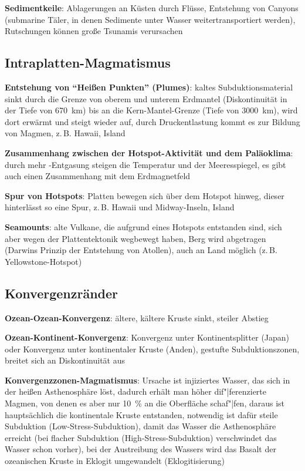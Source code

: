 \textbf{Sedimentkeile}:
Ablagerungen an Küsten durch Flüsse,
Entstehung von Canyons (submarine Täler, in denen Sedimente unter Wasser weitertransportiert
werden),
Rutschungen können große Tsunamis verursachen

\subsection{%
    Intraplatten-Magmatismus%
}

\textbf{Entstehung von "`Heißen Punkten"' (Plumes)}:
kaltes Subduktionsmaterial sinkt durch die Grenze von oberem und unterem Erdmantel
(Diskontinuität in der Tiefe von \SI{670}{\kilo\meter}) bis an die Kern-Mantel-Grenze
(Tiefe von \SI{3000}{\kilo\meter}), wird dort erwärmt und steigt wieder auf,
durch Druckentlastung kommt es zur Bildung von Magmen,
z.\,B. Hawaii, Island

\textbf{Zusammenhang zwischen der Hotspot-Aktivität und dem Paläoklima}:
durch mehr -Entgasung steigen die Temperatur und der Meeresspiegel,
es gibt auch einen Zusammenhang mit dem Erdmagnetfeld

\textbf{Spur von Hotspots}:
Platten bewegen sich über dem Hotspot hinweg,
dieser hinterlässt so eine Spur,
z.\,B. Hawaii und Midway-Inseln, Island

\textbf{Seamounts}:
alte Vulkane, die aufgrund eines Hotspots entstanden sind, sich aber wegen der Plattentektonik
wegbewegt haben,
Berg wird abgetragen (Darwins Prinzip der Entstehung von Atollen),
auch an Land möglich (z.\,B. Yellowstone-Hotspot)

\pagebreak

\subsection{%
    Konvergenzränder%
}

\textbf{Ozean-Ozean-Konvergenz}:
ältere, kältere Kruste sinkt, steiler Abstieg

\textbf{Ozean-Kontinent-Konvergenz}:
Konvergenz unter Kontinentsplitter (Japan) oder Konvergenz unter kontinentaler Kruste (Anden),
gestufte Subduktionszonen, breitet sich an Diskontinuität aus

\textbf{Konvergenzzonen-Magmatismus}:
Ursache ist injiziertes Wasser, das sich in der heißen Asthenosphäre löst,
dadurch erhält man höher dif"|ferenzierte Magmen, von denen es aber nur \SI{10}{\percent}
an die Oberfläche schaf"|fen,
daraus ist hauptsächlich die kontinentale Kruste entstanden,
notwendig ist dafür steile Subduktion
(Low-Stress-Subduktion), damit das Wasser die Asthenosphäre erreicht
(bei flacher Subduktion (High-Stress-Subduktion) verschwindet das Wasser schon vorher),
bei der Austreibung des Wassers wird das Basalt der ozeanischen Kruste in Eklogit umgewandelt
(Eklogitisierung)


